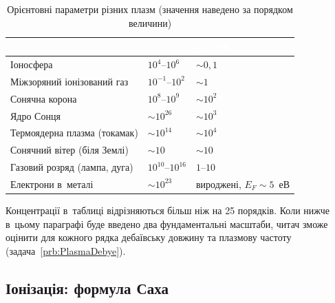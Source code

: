 \begin{table}[h!]\centering
	\caption{Орієнтовні параметри різних плазм (значення наведено за порядком величини)}
	\label{tab:plasma-types}
	\begin{tabularx}{\linewidth}{|>{\raggedright\arraybackslash}X|>{\centering\arraybackslash}X|>{\centering\arraybackslash}X|}
\hline
\rowcolor{themecolorlight}\multicolumn{1}{|c|}{\textcolor{white}{\textbf{Плазма}}} & \textcolor{white}{\textbf{$n_e$, $\mathrm{см}^{-3}$}} & \textcolor{white}{\textbf{$k_{\mathrm B}T$, еВ}} \\ \hline
Іоносфера & $10^{4}$--$10^{6}$ & $\sim0{,}1$ \\ \hline
\rowcolor{gray!10}Міжзоряний іонізований газ & $10^{-1}$--$10^{2}$ & $\sim1$ \\ \hline
Сонячна корона & $10^{8}$--$10^{9}$ & $\sim10^{2}$ \\ \hline
\rowcolor{gray!10}Ядро Сонця & $\sim10^{26}$ & $\sim10^{3}$ \\ \hline
Термоядерна плазма (токамак) & $\sim10^{14}$ & $\sim10^{4}$ \\ \hline
\rowcolor{gray!10}Сонячний вітер (біля Землі) & $\sim10$ & $\sim10$ \\ \hline
Газовий розряд (лампа, дуга) & $10^{10}$--$10^{16}$ & $1$--$10$ \\ \hline
\rowcolor{gray!10}Електрони в~металі & $\sim10^{23}$ & вироджені, $E_F\sim5$~еВ \\ \hline
\end{tabularx}
\end{table}

Концентрації в~таблиці відрізняються більш ніж на 25 порядків. Коли нижче в~цьому
параграфі буде введено два фундаментальні масштаби, читач зможе оцінити для кожного рядка
дебаївську довжину та плазмову частоту (задача~\ref{prb:PlasmaDebye}).



\subsection*{Іонізація: формула Саха}



